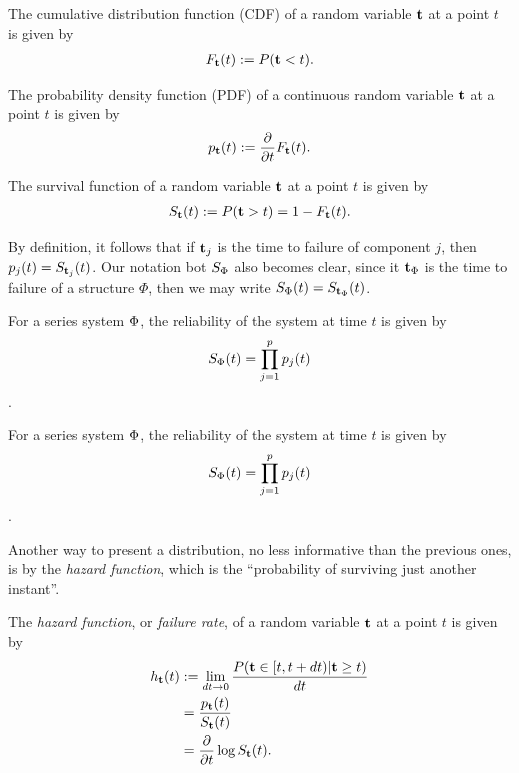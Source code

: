 \begin{definition}[CDF]
The cumulative distribution function (CDF) of a random variable $\mathbf{t}$ at a point $t$  is given by
\begin{align}
	F_{\mathbf{t}} (t):= P(\mathbf{t}<t).
\end{align}
\end{definition}

\begin{definition}[PDF]
The probability density function (PDF) of a continuous random variable $\mathbf{t}$ at a point $t$ is given by 
\begin{align}
	p_{\mathbf{t}} (t):= \frac{\partial}{\partial t}F_{\mathbf{t}} (t).
\end{align}
\end{definition}


\begin{definition}
The survival function of a random variable $\mathbf{t}$ at a point $t$ is given by 
\begin{align}
	S_{\mathbf{t}} (t):= P(\mathbf{t}>t)=1-F_{\mathbf{t}} (t).
\end{align}
\end{definition}
By definition, it follows that if $\mathbf{t}_j$ is the time to failure of component $j$, then $p_j(t)=S_{\mathbf{t}_j} (t)$.
Our notation bot $S_\Phi$ also becomes clear, since it $\mathbf{t}_\Phi$ is the time to failure of a structure $\Phi$, then we may write $S_\Phi(t)=S_{\mathbf{t}_\Phi} (t)$.


\begin{example}
For a series system $\Phi$, the reliability of the system at time $t$ is given by $$S_{\Phi} (t)=\prod_{j=1}^{p} p_j(t)$$.
\end{example}


\begin{example}
For a series system $\Phi$, the reliability of the system at time $t$ is given by $$S_{\Phi} (t)=\prod_{j=1}^{p} p_j(t)$$.
\end{example}





Another way to present a distribution, no less informative than the previous ones, is by the \emph{hazard function}, which is the ``probability of surviving just another instant''.
\begin{definition}
The \emph{hazard function}, or \emph{failure rate}, of a random variable $\mathbf{t}$ at a point $t$ is given by 
\begin{align}
	h_{\mathbf{t}} (t) &:= \lim_{dt\to 0}\frac{P( \mathbf{t} \in [t,t+dt)|\mathbf{t} \geq t )}{dt} \label{eq:hazard}\\
	&= \frac{p_{\mathbf{t}} (t)}{S_{\mathbf{t}} (t)} \\
	&= \frac{\partial}{\partial t}\log S_{\mathbf{t}} (t).
\end{align}
\end{definition}





